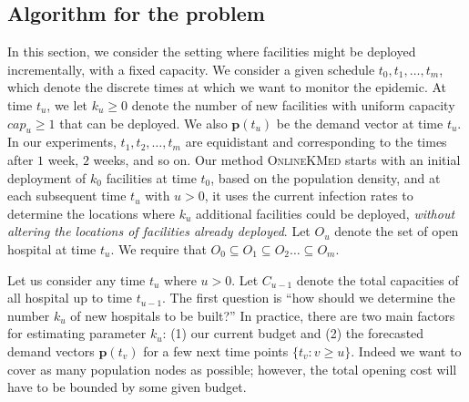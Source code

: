 \subsection*{Algorithm for the \probinc{} problem}
In this section, we consider the setting where facilities might be deployed incrementally, with a fixed capacity. We consider a given schedule $t_0, t_1, \ldots, t_m$, which denote the discrete times at which we want to monitor the epidemic. At time $t_u$, we let $k_u \geq 0$ denote the number of new facilities with uniform capacity $cap_u \geq 1$ that can be deployed. We also $\mathbf{p}(t_u)$ be the demand vector at time $t_u$. In our experiments, $t_1, t_2, \ldots, t_m$ are equidistant and corresponding to the times after $1$ week, $2$ weeks, and so on. Our method \textsc{OnlineKMed} starts with an initial
deployment of $k_0$ facilities at time $t_0$, based on the population density, and at each subsequent time $t_u$ with $u > 0$, it uses the current infection rates to determine the locations where $k_u$ additional facilities could be deployed, \emph{without altering the locations of facilities already deployed}. Let $O_u$ denote the set of open hospital at time $t_u$. We require that $O_0 \subseteq O_1 \subseteq O_2 \ldots \subseteq O_m$.

Let us consider any time $t_u$ where $u > 0$. Let $C_{u-1}$ denote the total capacities of all hospital up to time $t_{u-1}$. The first question is ``how should we determine the number $k_u$ of new hospitals to be built?'' In practice, there are two main factors for estimating parameter $k_u$: (1) our current budget and (2) the forecasted demand vectors $\mathbf{p}(t_v)$ for a few next time points $\{t_v: v \geq u\}$. Indeed we want to cover as many population nodes as possible; however, the total opening cost will have to be bounded by some given budget.

